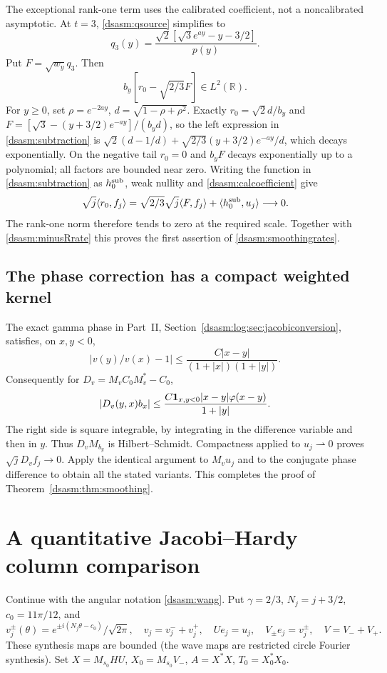 \documentclass[11pt,letterpaper]{article}
\theoremstyle{remark}\newtheorem{remark}[theorem]{Remark}
\newcommand{\R}{\mathbb R}\newcommand{\C}{\mathbb C}\newcommand{\N}{\mathbb N}
\begin{document}
The exceptional rank-one term uses the calibrated coefficient,
not a noncalibrated asymptotic. At $t=3$, \eqref{dsasm:qsource} simplifies to
\begin{equation}\label{dsasm:q3simple}
 q_3(y)=\frac{\sqrt2[\sqrt3e^{ay}-y-3/2]}{p(y)}.
\end{equation}
Put $F=\sqrt{w_y}q_3$. Then
\begin{equation}\label{dsasm:subtraction}
 b_y[r_0-\sqrt{2/3}F]\in L^2(\R).
\end{equation}
For $y\ge0$, set $\rho=e^{-2ay}$, $d=\sqrt{1-\rho+\rho^2}$.
Exactly $r_0=\sqrt2d/b_y$ and
$F=[\sqrt3-(y+3/2)e^{-ay}]/(b_yd)$, so the left expression in
\eqref{dsasm:subtraction} is
$\sqrt2(d-1/d)+\sqrt{2/3}(y+3/2)e^{-ay}/d$, which decays
exponentially. On the negative tail $r_0=0$ and $b_yF$ decays
exponentially up to a polynomial; all factors are bounded near zero.
Writing the function in \eqref{dsasm:subtraction} as $h_0^{\rm sub}$,
weak nullity and \eqref{dsasm:calcoefficient} give
\[
 \sqrt j\langle r_0,f_j\rangle
 =\sqrt{2/3}\sqrt j\langle F,f_j\rangle
      +\langle h_0^{\rm sub},u_j\rangle\longrightarrow0.
\]
The rank-one norm therefore tends to zero at the required scale.
Together with \eqref{dsasm:minusRrate} this proves the first assertion of
\eqref{dsasm:smoothingrates}.

\subsection{The phase correction has a compact weighted kernel}
The exact gamma phase in Part~II, Section~\ref{dsasm:log:sec:jacobiconversion}, satisfies, on $x,y<0$,
\[
 |v(y)/v(x)-1|\le
     \frac{C|x-y|}{(1+|x|)(1+|y|)}.
\]
Consequently for $D_v=M_vC_0M_v^*-C_0$,
\[
 |D_v(y,x)b_x|\le
       \frac{C\mathbf1_{x,y<0}|x-y|\varphi(x-y)}{1+|y|}.
\]
The right side is square integrable, by integrating in the difference
variable and then in $y$. Thus $D_vM_{b_y}$ is Hilbert--Schmidt.
Compactness applied to $u_j\rightharpoonup0$ proves
$\sqrt jD_vf_j\to0$. Apply the identical argument to $M_vu_j$ and
to the conjugate phase difference to obtain all the stated variants.
This completes the proof of Theorem~\ref{dsasm:thm:smoothing}.
\section{A quantitative Jacobi--Hardy column comparison}\label{dsasm:sec:columns}
Continue with the angular notation \eqref{dsasm:wang}. Put $\gamma=2/3$,
$N_j=j+3/2$, $c_0=11\pi/12$, and
\[
 v_j^\pm(\theta)=e^{\pm i(N_j\theta-c_0)}/\sqrt{2\pi},\quad
 v_j=v_j^-+v_j^+,\quad Ue_j=u_j,\quad V_\pm e_j=v_j^\pm,\quad V=V_-+V_+.
\]
These synthesis maps are bounded (the wave maps are restricted circle
Fourier synthesis). Set $X=M_{s_0}HU$, $X_0=M_{s_0}V_-$,
$A=X^*X$, $T_0=X_0^*X_0$.
\end{document}
